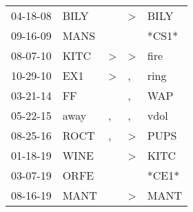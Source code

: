 \begin{supertabular}{p{0.07\textwidth}p{0.06\textwidth}p{0.02\textwidth}p{0.02\textwidth}p{0.06\textwidth}}
          04-18-08\textsuperscript{} &           BILY\textsuperscript{} &                  &     \textgreater &           BILY\textsuperscript{} \\
          09-16-09\textsuperscript{} &           MANS\textsuperscript{} &                  &                  &                            *CS1* \\
          08-07-10\textsuperscript{} &           KITC\textsuperscript{} &     \textgreater &     \textgreater &           fire\textsuperscript{} \\
          10-29-10\textsuperscript{} &            EX1\textsuperscript{} &     \textgreater &                , &           ring\textsuperscript{} \\
          03-21-14\textsuperscript{} &             FF\textsuperscript{} &                  &                , &            WAP\textsuperscript{} \\
          05-22-15\textsuperscript{} &           away\textsuperscript{} &                , &                , &           vdol\textsuperscript{} \\
          08-25-16\textsuperscript{} &           ROCT\textsuperscript{} &                , &     \textgreater &           PUPS\textsuperscript{} \\
          01-18-19\textsuperscript{} &           WINE\textsuperscript{} &                  &     \textgreater &           KITC\textsuperscript{} \\
          03-07-19\textsuperscript{} &           ORFE\textsuperscript{} &                  &                  &                            *CE1* \\
          08-16-19\textsuperscript{} &           MANT\textsuperscript{} &                  &     \textgreater &           MANT\textsuperscript{} \\
\end{supertabular}
